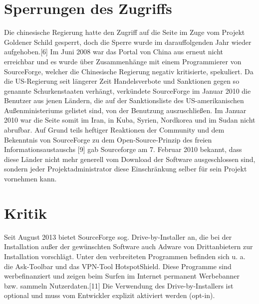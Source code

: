 \section{Sperrungen des Zugriffs}
Die chinesische Regierung hatte den Zugriff auf die Seite im Zuge vom Projekt Goldener Schild gesperrt, 
doch die Sperre wurde im darauffolgenden Jahr wieder aufgehoben.[6] Im Juni 2008 war das Portal von China 
aus erneut nicht erreichbar und es wurde über Zusammenhänge mit einem Programmierer von SourceForge, 
welcher die Chinesische Regierung negativ kritisierte, spekuliert. 
Da die US-Regierung seit längerer Zeit Handelsverbote und Sanktionen gegen so genannte Schurkenstaaten 
verhängt, verkündete SourceForge im Januar 2010 die Benutzer aus jenen Ländern, die auf der 
Sanktionsliste des US-amerikanischen Außenministeriums gelistet sind, von der Benutzung auszuschließen. 
Im Januar 2010 war die Seite somit im Iran, in Kuba, Syrien, Nordkorea und im Sudan nicht 
abrufbar. Auf Grund teils heftiger Reaktionen der Community und dem Bekenntnis von SourceForge zu 
dem Open-Source-Prinzip des freien Informationsaustauschs [9] gab Sourceforge am 7. Februar 2010 bekannt, 
dass diese Länder nicht mehr generell vom Download der Software ausgeschlossen sind, sondern 
jeder Projektadministrator diese Einschränkung selber für sein Projekt vornehmen kann.
\section{Kritik}
Seit August 2013 bietet SourceForge sog. Drive-by-Installer an, die bei der Installation 
außer der gewünschten Software auch Adware von Drittanbietern zur Installation vorschlägt. 
Unter den verbreiteten Programmen befinden sich u. a. die Ask-Toolbar und das VPN-Tool HotspotShield. 
Diese Programme sind werbefinanziert und zeigen beim Surfen im Internet permanent Werbebanner bzw. 
sammeln Nutzerdaten.[11] Die Verwendung des Drive-by-Installers ist optional und muss vom Entwickler 
explizit aktiviert werden (opt-in).

